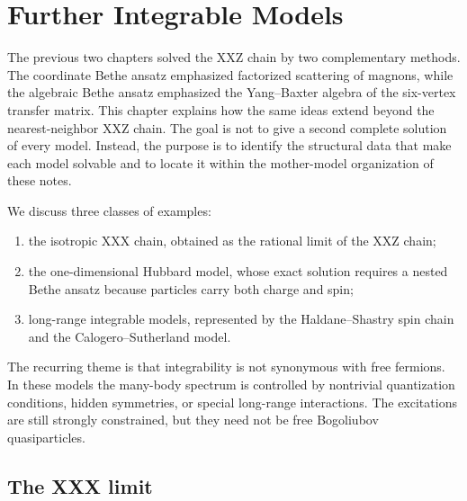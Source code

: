 \chapter{Further Integrable Models}
\label{chap:further-integrable-models}

The previous two chapters solved the XXZ chain by two complementary methods.
The coordinate Bethe ansatz emphasized factorized scattering of magnons, while
the algebraic Bethe ansatz emphasized the Yang--Baxter algebra of the six-vertex
transfer matrix.  This chapter explains how the same ideas extend beyond the
nearest-neighbor XXZ chain.  The goal is not to give a second complete solution
of every model.  Instead, the purpose is to identify the structural data that
make each model solvable and to locate it within the mother-model organization
of these notes.

We discuss three classes of examples:
\begin{enumerate}[label=(\roman*)]
    \item the isotropic XXX chain, obtained as the rational limit of the XXZ
    chain;
    \item the one-dimensional Hubbard model, whose exact solution requires a
    nested Bethe ansatz because particles carry both charge and spin;
    \item long-range integrable models, represented by the Haldane--Shastry spin
    chain and the Calogero--Sutherland model.
\end{enumerate}
The recurring theme is that integrability is not synonymous with free
fermions.  In these models the many-body spectrum is controlled by nontrivial
quantization conditions, hidden symmetries, or special long-range interactions.
The excitations are still strongly constrained, but they need not be free
Bogoliubov quasiparticles.

\section{The XXX limit}
\label{sec:further-xxx-limit}

